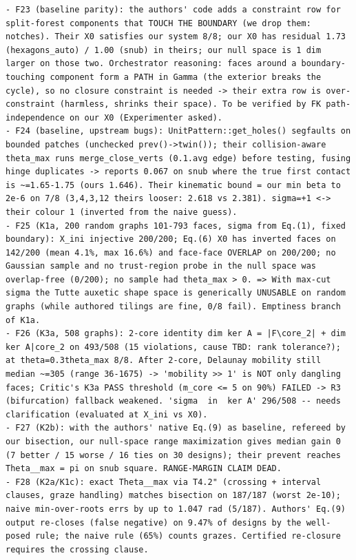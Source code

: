 \documentclass[10pt,a4paper]{article}
\begin{document}
\begin{lstlisting}
- F23 (baseline parity): the authors' code adds a constraint row for split-forest components that TOUCH THE BOUNDARY (we drop them: notches). Their X0 satisfies our system 8/8; our X0 has residual 1.73 (hexagons_auto) / 1.00 (snub) in theirs; our null space is 1 dim larger on those two. Orchestrator reasoning: faces around a boundary-touching component form a PATH in Gamma (the exterior breaks the cycle), so no closure constraint is needed -> their extra row is over-constraint (harmless, shrinks their space). To be verified by FK path-independence on our X0 (Experimenter asked).
- F24 (baseline, upstream bugs): UnitPattern::get_holes() segfaults on bounded patches (unchecked prev()->twin()); their collision-aware theta_max runs merge_close_verts (0.1.avg edge) before testing, fusing hinge duplicates -> reports 0.067 on snub where the true first contact is ~=1.65-1.75 (ours 1.646). Their kinematic bound = our min beta to 2e-6 on 7/8 (3,4,3,12 theirs looser: 2.618 vs 2.381). sigma=+1 <-> their colour 1 (inverted from the naive guess).
- F25 (K1a, 200 random graphs 101-793 faces, sigma from Eq.(1), fixed boundary): X_ini injective 200/200; Eq.(6) X0 has inverted faces on 142/200 (mean 4.1%, max 16.6%) and face-face OVERLAP on 200/200; no Gaussian sample and no trust-region probe in the null space was overlap-free (0/200); no sample had theta_max > 0. => With max-cut sigma the Tutte auxetic shape space is generically UNUSABLE on random graphs (while authored tilings are fine, 0/8 fail). Emptiness branch of K1a.
- F26 (K3a, 508 graphs): 2-core identity dim ker A = |F\core_2| + dim ker A|core_2 on 493/508 (15 violations, cause TBD: rank tolerance?); at theta=0.3theta_max 8/8. After 2-core, Delaunay mobility still median ~=305 (range 36-1675) -> 'mobility >> 1' is NOT only dangling faces; Critic's K3a PASS threshold (m_core <= 5 on 90%) FAILED -> R3 (bifurcation) fallback weakened. 'sigma  in  ker A' 296/508 -- needs clarification (evaluated at X_ini vs X0).
- F27 (K2b): with the authors' native Eq.(9) as baseline, refereed by our bisection, our null-space range maximization gives median gain 0 (7 better / 15 worse / 16 ties on 30 designs); their prevent reaches Theta__max = pi on snub square. RANGE-MARGIN CLAIM DEAD.
- F28 (K2a/K1c): exact Theta__max via T4.2" (crossing + interval clauses, graze handling) matches bisection on 187/187 (worst 2e-10); naive min-over-roots errs by up to 1.047 rad (5/187). Authors' Eq.(9) output re-closes (false negative) on 9.47% of designs by the well-posed rule; the naive rule (65%) counts grazes. Certified re-closure requires the crossing clause.

\end{lstlisting}
\end{document}
